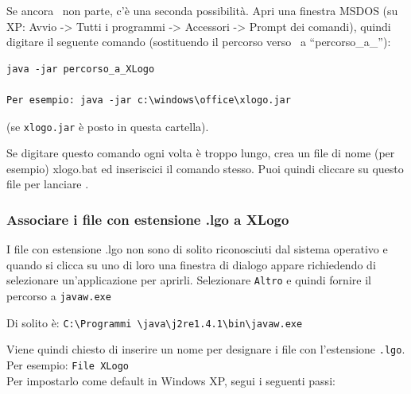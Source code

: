 Se ancora \xlogo\ non parte, c'è una seconda possibilità. Apri una finestra MSDOS (su XP: Avvio -> Tutti i programmi -> Accessori -> Prompt dei comandi), quindi digitare il seguente comando (sostituendo il percorso verso \xlogo\ a ``percorso\_a\_''):
\begin{center}
\begin{verbatim}
java -jar percorso_a_XLogo

Per esempio: java -jar c:\windows\office\xlogo.jar

\end{verbatim}
(se \texttt{xlogo.jar} è posto in questa cartella).

\end{center}

Se digitare questo comando ogni volta è troppo lungo, crea un file di nome (per esempio) xlogo.bat ed inseriscici il comando stesso. Puoi quindi cliccare su questo file per lanciare \xlogo.

\subsubsection*{Associare i file con estensione .lgo a XLogo}
I file con estensione .lgo non sono di solito riconosciuti dal sistema operativo e quando si clicca su uno di loro una finestra di dialogo appare richiedendo di selezionare un'applicazione per aprirli. Selezionare \texttt{Altro} e quindi fornire il percorso a \texttt{javaw.exe} \begin{center}
Di solito è: \texttt{C:\textbackslash{}Programmi \textbackslash{}java\textbackslash{}j2re1.4.1\textbackslash{}bin\textbackslash{}javaw.exe}
\end{center}  
Viene quindi chiesto di inserire un nome per designare i file con l'estensione \texttt{.lgo}.\\
Per esempio: \texttt{File XLogo}\\
Per impostarlo come default in Windows XP, segui i seguenti passi:

